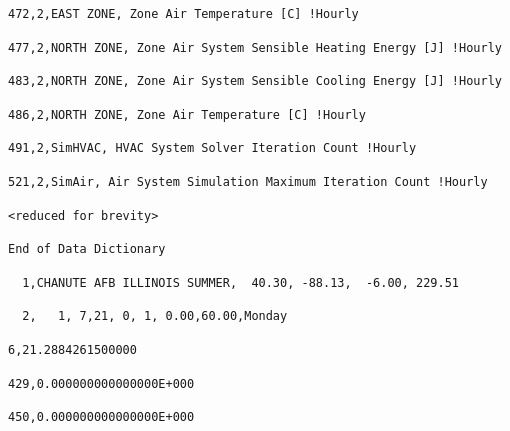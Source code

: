 \begin{lstlisting}
472,2,EAST ZONE, Zone Air Temperature [C] !Hourly
\end{lstlisting}

\begin{lstlisting}
477,2,NORTH ZONE, Zone Air System Sensible Heating Energy [J] !Hourly
\end{lstlisting}

\begin{lstlisting}
483,2,NORTH ZONE, Zone Air System Sensible Cooling Energy [J] !Hourly
\end{lstlisting}

\begin{lstlisting}
486,2,NORTH ZONE, Zone Air Temperature [C] !Hourly
\end{lstlisting}

\begin{lstlisting}
491,2,SimHVAC, HVAC System Solver Iteration Count !Hourly
\end{lstlisting}

\begin{lstlisting}
521,2,SimAir, Air System Simulation Maximum Iteration Count !Hourly
\end{lstlisting}

\begin{lstlisting}
<reduced for brevity>
\end{lstlisting}

\begin{lstlisting}
End of Data Dictionary
\end{lstlisting}

\begin{lstlisting}
  1,CHANUTE AFB ILLINOIS SUMMER,  40.30, -88.13,  -6.00, 229.51
\end{lstlisting}

\begin{lstlisting}
  2,   1, 7,21, 0, 1, 0.00,60.00,Monday
\end{lstlisting}

\begin{lstlisting}
6,21.2884261500000
\end{lstlisting}

\begin{lstlisting}
429,0.000000000000000E+000
\end{lstlisting}

\begin{lstlisting}
450,0.000000000000000E+000
\end{lstlisting}

